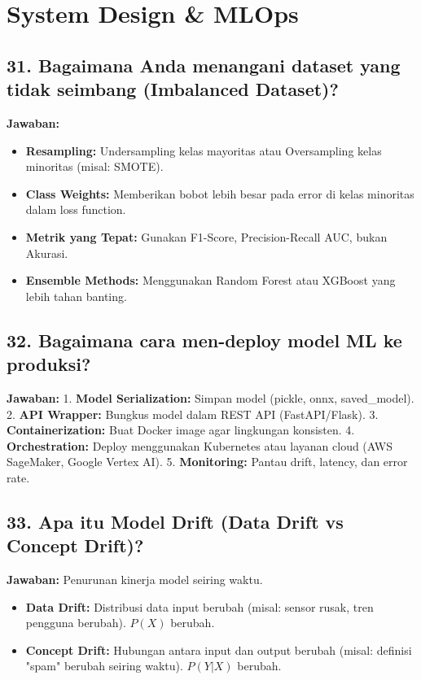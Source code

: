 \section{System Design & MLOps}

\subsection{31. Bagaimana Anda menangani dataset yang tidak seimbang (Imbalanced Dataset)?}
\textbf{Jawaban:}
\begin{itemize}
    \item \textbf{Resampling:} Undersampling kelas mayoritas atau Oversampling kelas minoritas (misal: SMOTE).
    \item \textbf{Class Weights:} Memberikan bobot lebih besar pada error di kelas minoritas dalam loss function.
    \item \textbf{Metrik yang Tepat:} Gunakan F1-Score, Precision-Recall AUC, bukan Akurasi.
    \item \textbf{Ensemble Methods:} Menggunakan Random Forest atau XGBoost yang lebih tahan banting.
\end{itemize}

\subsection{32. Bagaimana cara men-deploy model ML ke produksi?}
\textbf{Jawaban:}
1. \textbf{Model Serialization:} Simpan model (pickle, onnx, saved\_model).
2. \textbf{API Wrapper:} Bungkus model dalam REST API (FastAPI/Flask).
3. \textbf{Containerization:} Buat Docker image agar lingkungan konsisten.
4. \textbf{Orchestration:} Deploy menggunakan Kubernetes atau layanan cloud (AWS SageMaker, Google Vertex AI).
5. \textbf{Monitoring:} Pantau drift, latency, dan error rate.

\subsection{33. Apa itu Model Drift (Data Drift vs Concept Drift)?}
\textbf{Jawaban:}
Penurunan kinerja model seiring waktu.
\begin{itemize}
    \item \textbf{Data Drift:} Distribusi data input berubah (misal: sensor rusak, tren pengguna berubah). $P(X)$ berubah.
    \item \textbf{Concept Drift:} Hubungan antara input dan output berubah (misal: definisi "spam" berubah seiring waktu). $P(Y|X)$ berubah.
\end{itemize}

